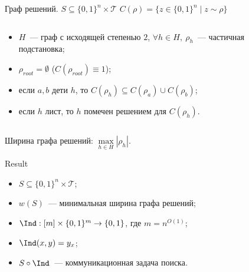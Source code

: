\begin{frame}{Граф решений. $S \subseteq \{0, 1\}^n \times \mathcal{T}$}
    $C(\rho) = \{z \in \{0, 1\}^n \mid z \sim \rho\}$
    
    \begin{columns}[t]
        \begin{column}{0.55\textwidth}
            \begin{itemize}
                \item $H$~--- граф с исходящей степенью $2$, $\forall h \in H, ~ {\rho}_h$~--- частичная
                    подстановка;
                \item $\rho_{root} = \emptyset$ ($C(\rho_{root}) \equiv 1$);
                \item если $a, b$ дети $h$, то $C(\rho_{h}) \subseteq C(\rho_a) \cup C(\rho_b)$;
                \item если $h$ лист, то $h$ помечен решением для $C(\rho_h)$.
            \end{itemize}
        \end{column}

		\begin{column}{0.4\textwidth}
            \begin{center}
                
            \end{center}
		\end{column}
	\end{columns}

    Ширина графа решений: $\max\limits_{h \in H} |\rho_h|$.
\end{frame}

\begin{frame}{Result}
    \begin{itemize}
        \item $S \subseteq \{0, 1\}^n \times \mathcal{T}$;
        \item $w(S)$~--- минимальная ширина графа решений;
        \pause
        \item $\Ind: [m] \times \{0, 1\}^m \to \{0, 1\}$, где $m = n^{O(1)}$;
        \item $\Ind(x, y) = y_x$;
        \pause
        \item $S \circ \Ind$~--- коммуникационная задача поиска.
    \end{itemize}


\end{frame}
